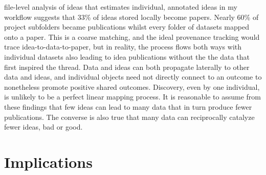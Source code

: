 \documentclass[]{elsarticle} %
\begin{document}
file-level analysis of ideas that estimates individual, annotated ideas
in my workflow suggests that 33\% of ideas stored locally become papers.
Nearly 60\% of project subfolders became publications whilst every
folder of datasets mapped onto a paper. This is a coarse matching, and
the ideal provenance tracking would trace idea-to-data-to-paper, but in
reality, the process flows both ways with individual datasets also
leading to idea publications without the the data that first inspired
the thread. Data and ideas can both propagate laterally to other data
and ideas, and individual objects need not directly connect to an
outcome to nonetheless promote positive shared outcomes. Discovery, even
by one individual, is unlikely to be a perfect linear mapping process.
It is reasonable to assume from these findings that few ideas can lead
to many data that in turn produce fewer publications. The converse is
also true that many data can reciprocally catalyze fewer ideas, bad or
good.

\section{Implications}\label{implications}
\end{document}
